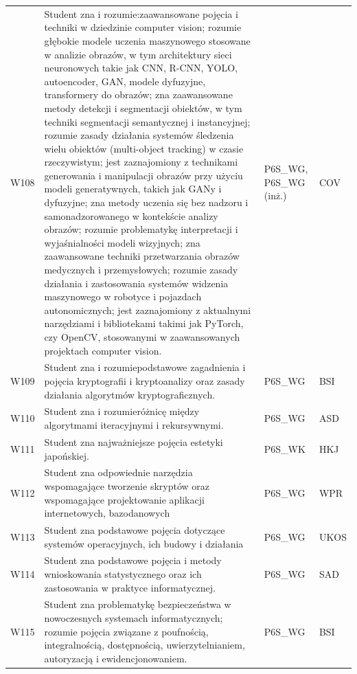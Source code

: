 \documentclass[12pt,a4paper]{article}
\begin{document}
{\begin{longtable}{m{1cm}m{8.8cm}m{2.1cm}m{2.5cm}}
\rowcolor{tableRowAlt} W108 & Student zna i rozumie:zaawansowane pojęcia i techniki w dziedzinie computer vision; rozumie głębokie modele uczenia maszynowego stosowane w analizie obrazów, w tym architektury sieci neuronowych takie jak CNN, R-CNN, YOLO, autoencoder, GAN, modele dyfuzyjne, transformery do obrazów; zna zaawansowane metody detekcji i segmentacji obiektów, w tym techniki segmentacji semantycznej i instancyjnej; rozumie zasady działania systemów śledzenia wielu obiektów (multi-object tracking) w czasie rzeczywistym; jest zaznajomiony z technikami generowania i manipulacji obrazów przy użyciu modeli generatywnych, takich jak GANy i dyfuzyjne; zna metody uczenia się bez nadzoru i samonadzorowanego w kontekście analizy obrazów; rozumie problematykę interpretacji i wyjaśnialności modeli wizyjnych; zna zaawansowane techniki przetwarzania obrazów medycznych i przemysłowych; rozumie zasady działania i zastosowania systemów widzenia maszynowego w robotyce i pojazdach autonomicznych; jest zaznajomiony z aktualnymi narzędziami i bibliotekami takimi jak PyTorch, czy OpenCV, stosowanymi w zaawansowanych projektach computer vision. & {\scriptsize P6S\_WG, P6S\_WG {\scriptsize (inż.)}} & {\scriptsize COV} \\
\rowcolor{tableRowLight} W109 & Student zna i rozumiepodstawowe zagadnienia i pojęcia kryptografii i kryptoanalizy oraz zasady działania algorytmów kryptograficznych. & {\scriptsize P6S\_WG} & {\scriptsize BSI} \\
\rowcolor{tableRowAlt} W110 & Student zna i rozumieróżnicę między algorytmami iteracyjnymi i rekursywnymi. & {\scriptsize P6S\_WG} & {\scriptsize ASD} \\
\rowcolor{tableRowLight} W111 & Student zna najważniejsze pojęcia estetyki japońskiej. & {\scriptsize P6S\_WK} & {\scriptsize HKJ} \\
\rowcolor{tableRowAlt} W112 & Student zna odpowiednie narzędzia wspomagające tworzenie skryptów oraz wspomagające projektowanie aplikacji internetowych, bazodanowych & {\scriptsize P6S\_WG} & {\scriptsize WPR} \\
\rowcolor{tableRowLight} W113 & Student zna podstawowe pojęcia dotyczące systemów operacyjnych, ich budowy i działania & {\scriptsize P6S\_WG} & {\scriptsize UKOS} \\
\rowcolor{tableRowAlt} W114 & Student zna podstawowe pojęcia i metody wnioskowania statystycznego oraz ich zastosowania w praktyce informatycznej. & {\scriptsize P6S\_WG} & {\scriptsize SAD} \\
\rowcolor{tableRowLight} W115 & Student zna problematykę bezpieczeństwa w nowoczesnych systemach informatycznych; rozumie pojęcia związane z poufnością, integralnością, dostępnością, uwierzytelnianiem, autoryzacją i ewidencjonowaniem. & {\scriptsize P6S\_WG} & {\scriptsize BSI} \\

\end{longtable}}
\end{document}
